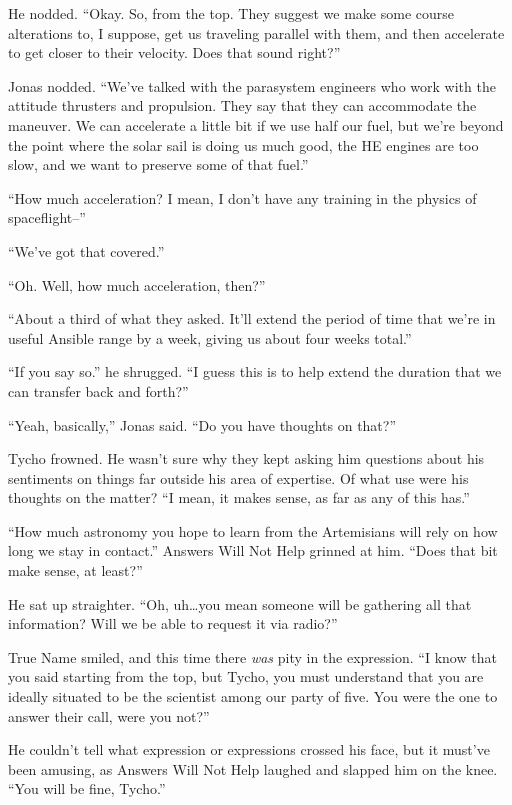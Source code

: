 He nodded. ``Okay. So, from the top. They suggest we make some course alterations to, I suppose, get us traveling parallel with them, and then accelerate to get closer to their velocity. Does that sound right?''

Jonas nodded. ``We've talked with the parasystem engineers who work with the attitude thrusters and propulsion. They say that they can accommodate the maneuver. We can accelerate a little bit if we use half our fuel, but we're beyond the point where the solar sail is doing us much good, the HE engines are too slow, and we want to preserve some of that fuel.''

``How much acceleration? I mean, I don't have any training in the physics of spaceflight--''

``We've got that covered.''

``Oh. Well, how much acceleration, then?''

``About a third of what they asked. It'll extend the period of time that we're in useful Ansible range by a week, giving us about four weeks total.''

``If you say so.'' he shrugged. ``I guess this is to help extend the duration that we can transfer back and forth?''

``Yeah, basically,'' Jonas said. ``Do you have thoughts on that?''

Tycho frowned. He wasn't sure why they kept asking him questions about his sentiments on things far outside his area of expertise. Of what use were his thoughts on the matter? ``I mean, it makes sense, as far as any of this has.''

``How much astronomy you hope to learn from the Artemisians will rely on how long we stay in contact.'' Answers Will Not Help grinned at him. ``Does that bit make sense, at least?''

He sat up straighter. ``Oh, uh\ldots you mean someone will be gathering all that information? Will we be able to request it via radio?''

True Name smiled, and this time there \emph{was} pity in the expression. ``I know that you said starting from the top, but Tycho, you must understand that you are ideally situated to be the scientist among our party of five. You were the one to answer their call, were you not?''

He couldn't tell what expression or expressions crossed his face, but it must've been amusing, as Answers Will Not Help laughed and slapped him on the knee. ``You will be fine, Tycho.''

